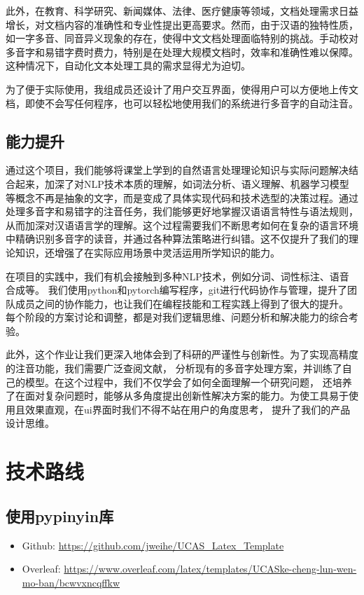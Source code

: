 \documentclass[12pt,hyperref,a4paper,UTF8]{ctexart}
\begin{document}
此外，在教育、科学研究、新闻媒体、法律、医疗健康等领域，文档处理需求日益增长，对文档内容的准确性和专业性提出更高要求。然而，由于汉语的独特性质，如一字多音、同音异义现象的存在，使得中文文档处理面临特别的挑战。手动校对多音字和易错字费时费力，特别是在处理大规模文档时，效率和准确性难以保障。这种情况下，自动化文本处理工具的需求显得尤为迫切。

为了便于实际使用，我组成员还设计了用户交互界面，使得用户可以方便地上传文档，即使不会写任何程序，也可以轻松地使用我们的系统进行多音字的自动注音。
\subsection{能力提升}
通过这个项目，我们能够将课堂上学到的自然语言处理理论知识与实际问题解决结合起来，加深了对NLP技术本质的理解，如词法分析、语义理解、机器学习模型等概念不再是抽象的文字，而是变成了具体实现代码和技术选型的决策过程。通过处理多音字和易错字的注音任务，我们能够更好地掌握汉语语言特性与语法规则，从而加深对汉语语言学的理解。这个过程需要我们不断思考如何在复杂的语言环境中精确识别多音字的读音，并通过各种算法策略进行纠错。这不仅提升了我们的理论知识，还增强了在实际应用场景中灵活运用所学知识的能力。

在项目的实践中，我们有机会接触到多种NLP技术，例如分词、词性标注、语音合成等。
我们使用python和pytorch编写程序，git进行代码协作与管理，提升了团队成员之间的协作能力，也让我们在编程技能和工程实践上得到了很大的提升。
每个阶段的方案讨论和调整，都是对我们逻辑思维、问题分析和解决能力的综合考验。

此外，这个作业让我们更深入地体会到了科研的严谨性与创新性。为了实现高精度的注音功能，我们需要广泛查阅文献，
分析现有的多音字处理方案，并训练了自己的模型。在这个过程中，我们不仅学会了如何全面理解一个研究问题，
还培养了在面对复杂问题时，能够从多角度提出创新性解决方案的能力。为使工具易于使用且效果直观，在ui界面时我们不得不站在用户的角度思考，
提升了我们的产品设计思维。
\section{技术路线}
\subsection{使用pypinyin库}
\begin{itemize}
    \item Github: \url{https://github.com/jweihe/UCAS_Latex_Template}
    \item Overleaf:  \url{https://www.overleaf.com/latex/templates/UCASke-cheng-lun-wen-mo-ban/bcwvxncqffkw}
\end{itemize}


\end{document}
